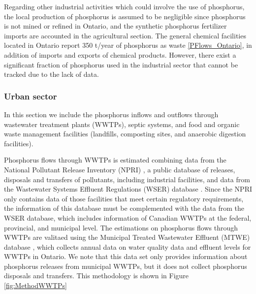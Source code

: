 \documentclass[authoryear]{elsarticle}
\begin{document}
Regarding other industrial activities which could involve the use of phosphorus, the local production of phosphorus is assumed to be negligible since phosphorus is not mined or refined in Ontario, and the synthetic phosphorus fertilizer imports are accounted in the agricultural section. The general chemical facilities located in Ontario report 350 t/year of phosphorus as waste \ref{PFlows_Ontario}, in addition of imports and exports of chemical products. However, there exist a significant fraction of phosphorus used in the industrial sector that cannot be tracked due to the lack of data.


\subsubsection{Urban sector}
In this section we include the phosphorus inflows and outflows through wastewater treatment plants (WWTPs), septic systems, and food and organic waste management facilities (landfills, composting sites, and anaerobic digestion facilities).


Phosphorus flows through WWTPs is estimated combining data from the National Pollutant Release Inventory (NPRI) \citep{NPRI}, a public database of releases, disposals and transfers of pollutants, including industrial facilities, and data from the Wastewater Systems Effluent Regulations (WSER) database \citep{WSER}. Since the NPRI only contains data of those facilities that meet certain regulatory requirements, the information of this database must be complemented with the data from the WSER database, which includes information of Canadian WWTPs at the federal, provincial, and municipal level. The estimations on phosphorus flows through WWTPs are valitaed using the Municipal Treated Wastewater Effluent (MTWE) database \citep{MTWE}, which collects annual data on water quality data and effluent levels for WWTPs in Ontario.
We note that this data set only provides information about phosphorus releases from municipal WWTPs, but it does not collect phosphorus disposals and transfers.
This methodology is shown in Figure \ref{fig:MethodWWTPs}
\end{document}
